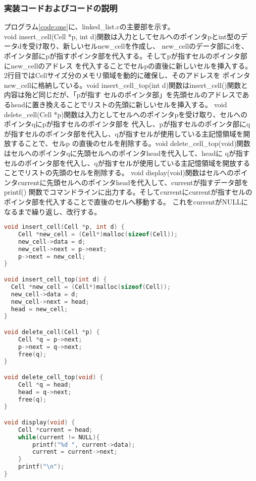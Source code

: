 \documentclass{ltjsarticle}
\begin{document}
\subsubsection{実装コードおよびコードの説明}\label{subsubsec:実装コードおよびコードの説明1}
プログラム\ref{code:one}に、linked\_list.cの主要部を示す。 \\ \indent
void insert\_cell(Cell *p, int d)関数は入力としてセルへのポインタpとint型のデータdを受け取り、新しいセルnew\_cellを作成し、
new\_cellのデータ部にdを、ポインタ部にpが指すポインタ部を代入する。そしてpが指すセルのポインタ部にnew\_cellのアドレス
を代入することでセルpの直後に新しいセルを挿入する。2行目ではCellサイズ分のメモリ領域を動的に確保し、そのアドレスを
ポインタnew\_cellに格納している。void insert\_cell\_top(int d)関数はinsert\_cell()関数と内容は殆ど同じだが、「pが指す
セルのポインタ部」を先頭セルのアドレスであるheadに置き換えることでリストの先頭に新しいセルを挿入する。
void delete\_cell(Cell *p)関数は入力としてセルへのポインタpを受け取り、セルへのポインタqにpが指すセルのポインタ部を
代入し、pが指すセルのポインタ部にqが指すセルのポインタ部を代入し、qが指すセルが使用している主記憶領域を開放することで、セルp
の直後のセルを削除する。void delete\_cell\_top(void)関数はセルへのポインタqに先頭セルへのポインタheadを代入して、headに
qが指すセルのポインタ部を代入し、qが指すセルが使用している主記憶領域を開放することでリストの先頭のセルを削除する。
void display(void)関数はセルへのポインタcurrentに先頭セルへのポインタheadを代入して、currentが指すデータ部をprintf()
関数でコマンドラインに出力する。そしてcurrentにcurrentが指すセルのポインタ部を代入することで直後のセルへ移動する。
これをcurrentがNULLになるまで繰り返し、改行する。
\begin{lstlisting}[caption=linked\_list.cの主要部, label=code:one, language=C, captionpos = b]
void insert_cell(Cell *p, int d) {
    Cell *new_cell = (Cell*)malloc(sizeof(Cell));
    new_cell->data = d;
    new_cell->next = p->next;
    p->next = new_cell;
}

void insert_cell_top(int d) {
  Cell *new_cell = (Cell*)malloc(sizeof(Cell));
  new_cell->data = d;
  new_cell->next = head;
  head = new_cell;
}

void delete_cell(Cell *p) {
    Cell *q = p->next;
    p->next = q->next;
    free(q);
}

void delete_cell_top(void) {
    Cell *q = head;
    head = q->next;
    free(q);
}

void display(void) {
    Cell *current = head;
    while(current != NULL){
        printf("%d ", current->data);
        current = current->next;
    }
    printf("\n");
}
\end{lstlisting}
\end{document}
